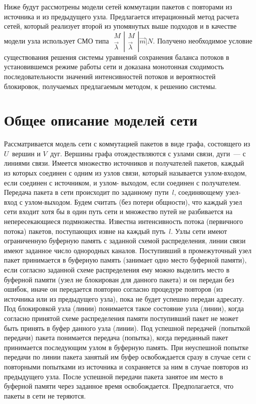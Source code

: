 \begin{multicols}{2}
     Ниже будут рассмотрены модели сетей коммутации пакетов с повторами 
из источника и из предыдущего узла. Предлагается итерационный метод 
расчета сетей, который реализует второй из упомянутых выше подходов и в 
качестве модели узла использует СМО типа $
      \begin{matrix}
      M \\ \vec{\lambda}
      \end{matrix}
      \left |
      \begin{matrix}
      M \\ \vec{\lambda}
      \end{matrix}
      \right |
      \vec{m} \vert N$. Получено необходимое условие существования решения 
системы уравнений сохранения баланса потоков в установившемся режиме 
работы сети и доказана монотонная сходимость последовательности значений 
интенсивностей потоков и вероятностей блокировок, получаемых 
предлагаемым методом, к решению системы.
     
\section{Общее описание моделей сети}
     
     Рассматривается модель сети с коммутацией пакетов в виде графа, 
состоящего из $U$~вершин и $V$~дуг. Вершины графа отождествляются с 
узлами связи, дуги~--- с линиями связи. Имеется множество источников и 
получателей пакетов, каждый из которых соединен с одним из узлов связи, 
который называется узлом-входом, если соединен с источником, и узлом-
выходом, если соединен с получателем. Передача пакета в сети происходит по 
заданному пути~$l$, соединяющему узел-вход с узлом-выходом. Будем считать 
(без потери общности), что каждый узел сети входит хотя бы в один путь сети и 
множество путей не разбивается на непересекающиеся подмножества. Известна 
интенсивность потока (первичного потока) пакетов, поступающих извне на 
каждый путь~$l$. Узлы сети имеют ограниченную буферную память с заданной 
схемой распределения, линии связи имеют заданное число однородных 
каналов. Поступивший в промежуточный узел пакет принимается в буферную 
память (занимает одно место буферной памяти), если согласно заданной схеме 
распределения ему можно выделить место в буферной памяти (узел не 
блокирован для данного пакета) и он передан без ошибок, иначе он передается 
повторно согласно процедуре повторов (из источника или из предыдущего 
узла), пока не будет успешно передан адресату. Под блокировкой узла (линии) 
понимается такое состояние узла (линии), когда согласно принятой схеме 
распределения памяти поступивший пакет не может быть принять в буфер 
данного узла (линии). Под успешной передачей (попыткой передачи) пакета 
понимается передача (попытка), когда переданный пакет принимается 
последующим узлом в буферную память. При неуспешной попытке передачи 
по линии пакета занятый им буфер освобождается сразу в случае сети с 
повторными попытками из источника и сохраняется за ним в случае повторов 
из предыдущего узла. После успешной передачи пакета занятое им место в 
буферной памяти через заданное время освобождается. Предполагается, что 
пакеты в сети не теряются.
     

\end{multicols}
